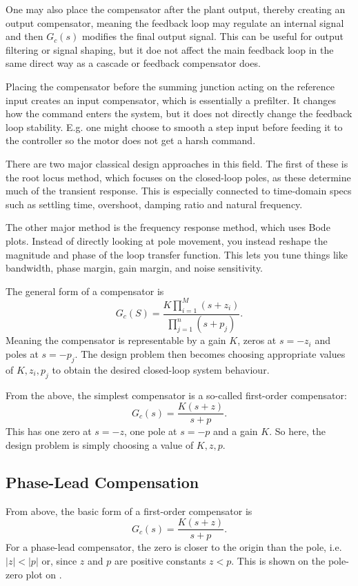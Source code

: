 One may also place the compensator after the plant output, thereby creating an output compensator, meaning the feedback loop may regulate an internal signal and then $G_c(s)$ modifies the final output signal.
This can be useful for output filtering or signal shaping, but it doe not affect the main feedback loop in the same direct way as a cascade or feedback compensator does.

Placing the compensator before the summing junction acting on the reference input creates an input compensator, which is essentially a prefilter.
It changes how the command enters the system, but it does not directly change the feedback loop stability.
E.g. one might choose to smooth a step input before feeding it to the controller so the motor does not get a harsh command. 

There are two major classical design approaches in this field.
The first of these is the root locus method, which focuses on the closed-loop poles, as these determine much of the transient response.
This is especially connected to time-domain specs such as settling time, overshoot, damping ratio and natural frequency.

The other major method is the frequency response method, which uses Bode plots.
Instead of directly looking at pole movement, you instead reshape the magnitude and phase of the loop transfer function.
This lets you tune things like bandwidth, phase margin, gain margin, and noise sensitivity.

The general form of a compensator is
\begin{equation*}
  G_c(S) = \frac{K \prod_{i = 1}^{M} (s + z_i)}{\prod_{j = 1}^{n} \left( s + p_j \right)}
.\end{equation*}
Meaning the compensator is representable by a gain $K$, zeros at $s = -z_i$ and poles at $s = - p_j$.
The design problem then becomes choosing appropriate values of $K, z_i, p_j$ to obtain the desired closed-loop system behaviour.

From the above, the simplest compensator is a so-called first-order compensator:
\begin{equation*}
  G_c(s) = \frac{K(s +z)}{s + p}
.\end{equation*}
This has one zero at $s = -z$, one pole at $s = -p$ and a gain $K$.
So here, the design problem is simply choosing a value of $K, z,p$.

\subsection{Phase-Lead Compensation}
From above, the basic form  of a first-order compensator is
\begin{equation*}
  G_c(s) = \frac{K(s+z)}{s+p}
.\end{equation*}
For a phase-lead compensator, the zero is closer to the origin than the pole, i.e. $\left| z \right| < \left| p \right|$ or, since $z$ and $p$ are positive constants $z < p$. This is shown on the pole-zero plot on .

